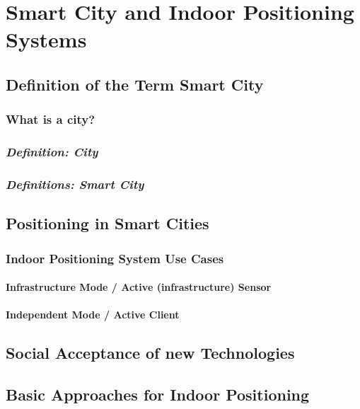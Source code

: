 \section{Smart City and Indoor Positioning Systems} %

\subsection{Definition of the Term Smart City} 
 
\subsubsection{What is a city?}
 
\subsubsection{\textit{Definition: City}}

\subsubsection{\textit{Definitions: Smart City}}


\subsection{Positioning in Smart Cities}\label{posInCS}

\subsubsection{Indoor Positioning System Use Cases}

\paragraph{Infrastructure Mode / Active (infrastructure) Sensor}

\paragraph{Independent Mode / Active Client}

\subsection{Social Acceptance of new Technologies}

\subsection{Basic Approaches for Indoor Positioning}

